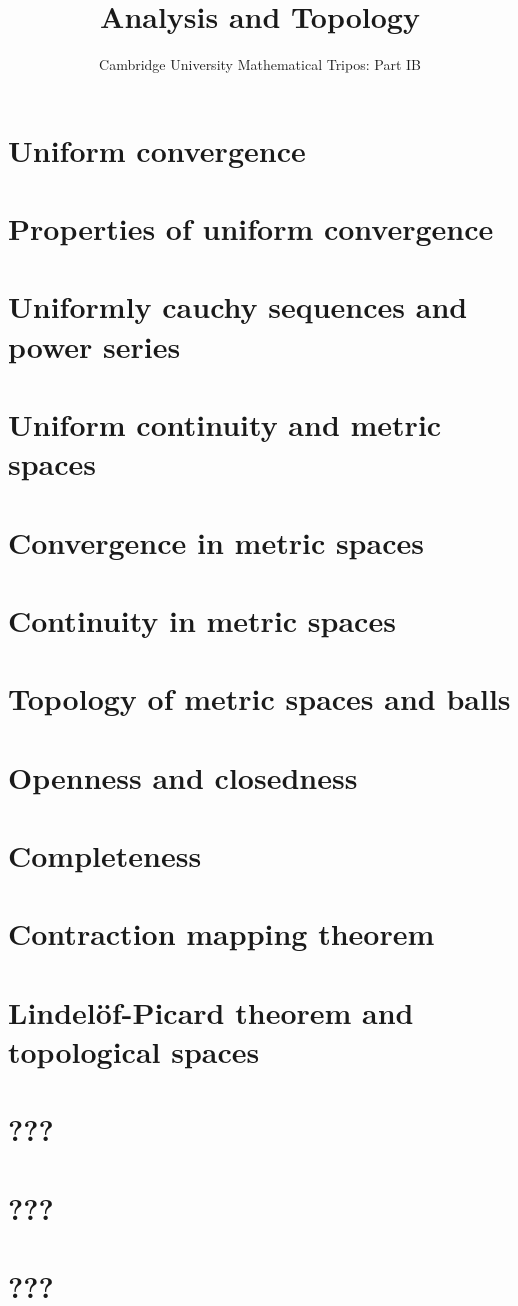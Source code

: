 \documentclass{article}
\title{Analysis and Topology}
\author{Cambridge University Mathematical Tripos: Part IB}
\begin{document}
\maketitle

\tableofcontentsnewpage{}

\section{Uniform convergence}

\section{Properties of uniform convergence}

\section{Uniformly cauchy sequences and power series}

\section{Uniform continuity and metric spaces}

\section{Convergence in metric spaces}

\section{Continuity in metric spaces}

\section{Topology of metric spaces and balls}

\section{Openness and closedness}

\section{Completeness}

\section{Contraction mapping theorem}

\section{Lindel\"of-Picard theorem and topological spaces}

\section{???}

\section{???}

\section{???}

\end{document}
